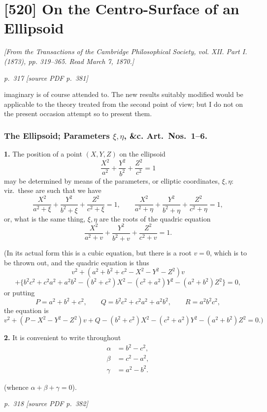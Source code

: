 \documentclass[11pt,a4paper]{article}
\newcommand{\pagemarker}[2]{\par\bigskip\noindent\textit{p.~#1 [source PDF p.~#2]}\par\smallskip}
\begin{document}
\section*{[520] On the Centro-Surface of an Ellipsoid}
\begin{center}
\textit{[From the Transactions of the Cambridge Philosophical Society, vol. XII. Part I. (1873), pp. 319--365. Read March 7, 1870.]}
\end{center}
\pagemarker{317}{381}

\noindent
imaginary is of course attended to. The new results suitably modified
would be applicable to the theory treated from the second point of view; but I do not
on the present occasion attempt so to present them.

\subsubsection*{The Ellipsoid; Parameters $\xi,\eta$, \&c. Art.\ Nos.\ 1--6.}

\textbf{1.} The position of a point $(X, Y, Z)$ on the ellipsoid
\[
\frac{X^2}{a^2}+\frac{Y^2}{b^2}+\frac{Z^2}{c^2}=1
\]
may be determined by means of the parameters, or elliptic coordinates, $\xi, \eta$: viz.\ these are such that we have
\[
\frac{X^2}{a^2+\xi}+\frac{Y^2}{b^2+\xi}+\frac{Z^2}{c^2+\xi}=1,\qquad
\frac{X^2}{a^2+\eta}+\frac{Y^2}{b^2+\eta}+\frac{Z^2}{c^2+\eta}=1,
\]
or, what is the same thing, $\xi, \eta$ are the roots of the quadric equation
\[
\frac{X^2}{a^2+v}+\frac{Y^2}{b^2+v}+\frac{Z^2}{c^2+v}=1.
\]

(In its actual form this is a cubic equation, but there is a root $v=0$, which is to be thrown out, and the quadric equation is thus
\[
v^2+(a^2+b^2+c^2-X^2-Y^2-Z^2)v
\]
\[
+\{b^2c^2+c^2a^2+a^2b^2-(b^2+c^2)X^2-(c^2+a^2)Y^2-(a^2+b^2)Z^2\}=0,
\]
or putting
\[
P=a^2+b^2+c^2,\qquad Q=b^2c^2+c^2a^2+a^2b^2,\qquad R=a^2b^2c^2,
\]
the equation is
\[
v^2+(P-X^2-Y^2-Z^2)v+Q-(b^2+c^2)X^2-(c^2+a^2)Y^2-(a^2+b^2)Z^2=0.)
\]

\textbf{2.} It is convenient to write throughout
\begin{align*}
\alpha&=b^2-c^2,\\
\beta&=c^2-a^2,\\
\gamma&=a^2-b^2.
\end{align*}

(whence $\alpha+\beta+\gamma=0$).

\clearpage

\pagemarker{318}{382}
\end{document}
